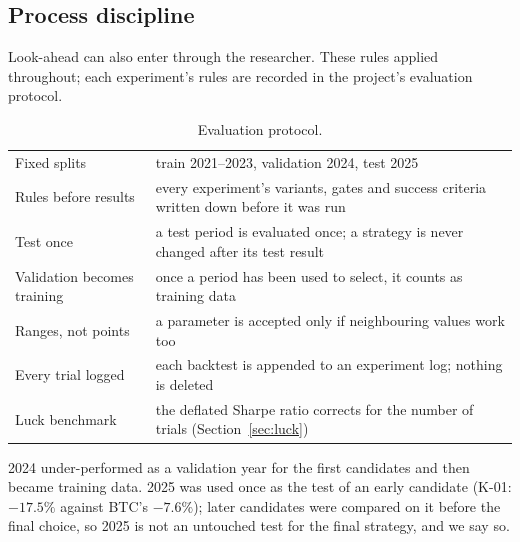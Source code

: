\documentclass[11pt,a4paper]{article}
\theoremstyle{definition}
\begin{document}
\subsection{Process discipline}
Look-ahead can also enter through the researcher. These rules applied throughout; each experiment's rules are recorded in the project's evaluation protocol.
\begin{table}[htbp]\centering\small
\begin{tabularx}{\linewidth}{@{}p{40mm}L@{}}
\toprule
Fixed splits & train 2021--2023, validation 2024, test 2025\\
Rules before results & every experiment's variants, gates and success criteria written down before it was run\\
Test once & a test period is evaluated once; a strategy is never changed after its test result\\
Validation becomes training & once a period has been used to select, it counts as training data\\
Ranges, not points & a parameter is accepted only if neighbouring values work too\\
Every trial logged & each backtest is appended to an experiment log; nothing is deleted\\
Luck benchmark & the deflated Sharpe ratio corrects for the number of trials (Section~\ref{sec:luck})\\
\bottomrule
\end{tabularx}
\caption{Evaluation protocol.}
\end{table}
2024 under-performed as a validation year for the first candidates and then became training data. 2025 was used once as the test of an early candidate (K-01: $-17.5\%$ against BTC's $-7.6\%$); later candidates were compared on it before the final choice, so 2025 is not an untouched test for the final strategy, and we say so.
\end{document}
